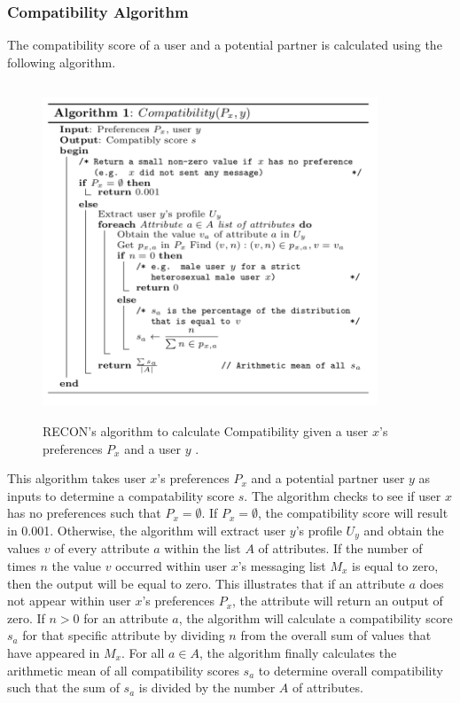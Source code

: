 \documentclass[11pt]{article}
\begin{document}
 \subsubsection{Compatibility Algorithm}
 The compatibility score of a user and a potential partner is calculated using the following algorithm.
 
\begin{figure}[h]
\begin{center}
\includegraphics[width=10cm,height=10cm,keepaspectratio]{Recon_Alg1.png} 
\caption{RECON's algorithm to calculate Compatibility given a user $x$'s preferences $P_x$ and a user $y$ \cite{RECON}.}    
\end{center}
\end{figure}

\indent This algorithm takes user $x$'s preferences $P_x$ and a potential partner user $y$ as inputs to determine a compatability score $s$. The algorithm checks to see if user $x$ has no preferences such that $P_x = \emptyset$. If $P_x = \emptyset$, the compatibility score will result in 0.001. Otherwise, the algorithm will extract user $y$'s profile $U_y$ and obtain the values $v$ of every attribute $a$ within the list $A$ of attributes. If the number of times $n$ the value $v$ occurred within user $x$'s messaging list $M_x$ is equal to zero, then the output will be equal to zero. This illustrates that if an attribute $a$ does not appear within user $x$'s preferences $P_x$, the attribute will return an output of zero. If $n>0$ for an attribute $a$, the algorithm will calculate a compatibility score $s_a$ for that specific attribute by dividing $n$ from the overall sum of values that have appeared in $M_x$. For all $a \in A$, the algorithm finally calculates the arithmetic mean of all compatibility scores $s_a$ to determine overall compatibility such that the sum of $s_a$ is divided by the number $A$ of attributes.
\end{document}
